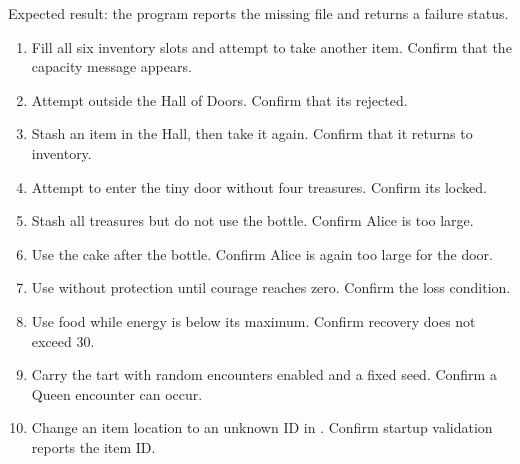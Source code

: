 \documentclass[letterpaper,10pt,english]{sphinxmanual}
\begin{document}
\begin{sphinxVerbatim}[commandchars=\\\{\}]
  
\end{sphinxVerbatim}

\sphinxAtStartPar
Expected result: the program reports the missing  file and
returns a failure status.
\begin{enumerate}
%
\item {} 
\sphinxAtStartPar
Fill all six inventory slots and attempt to take another item. Confirm that
the capacity message appears.

\item {} 
\sphinxAtStartPar
Attempt  outside the Hall of Doors. Confirm that its rejected.

\item {} 
\sphinxAtStartPar
Stash an item in the Hall, then take it again. Confirm that it returns to
inventory.

\item {} 
\sphinxAtStartPar
Attempt to enter the tiny door without four treasures. Confirm its locked.

\item {} 
\sphinxAtStartPar
Stash all treasures but do not use the bottle. Confirm Alice is too large.

\item {} 
\sphinxAtStartPar
Use the cake after the bottle. Confirm Alice is again too large for the door.

\item {} 
\sphinxAtStartPar
Use  without protection until courage reaches zero. Confirm
the loss condition.

\item {} 
\sphinxAtStartPar
Use food while energy is below its maximum. Confirm recovery does not exceed
30.

\item {} 
\sphinxAtStartPar
Carry the tart with random encounters enabled and a fixed seed. Confirm a
Queen encounter can occur.

\item {} 
\sphinxAtStartPar
Change an item location to an unknown ID in . Confirm startup
validation reports the item ID.

\end{enumerate}
\end{document}
